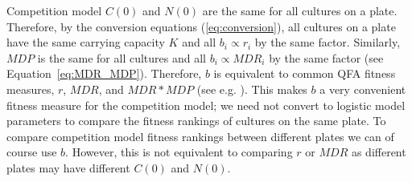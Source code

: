Competition model \(C(0)\) and \(N(0)\) are the same for all cultures
on a plate. Therefore, by the conversion equations
(\ref{eq:conversion}), all cultures on a plate have the same carrying
capacity \(K\) and all \(b_{i} \propto r_{i}\) by the same
factor. Similarly, \(MDP\) is the same for all cultures and all
\(b_{i} \propto MDR_{i}\) by the same factor (see
Equation~\ref{eq:MDR_MDP}). Therefore, \(b\) is equivalent to common
QFA fitness measures, \(r\), \(MDR\), and \(MDR*MDP\) (see
e.g. \citet{Addinall2011}). This makes \(b\) a very convenient fitness
measure for the competition model; we need not convert to logistic
model parameters to compare the fitness rankings of cultures on the
same plate. To compare competition model fitness rankings between
different plates we can of course use \(b\). However, this is not
equivalent to comparing \(r\) or \(MDR\) as different plates may have
different \(C(0)\) and \(N(0)\).

